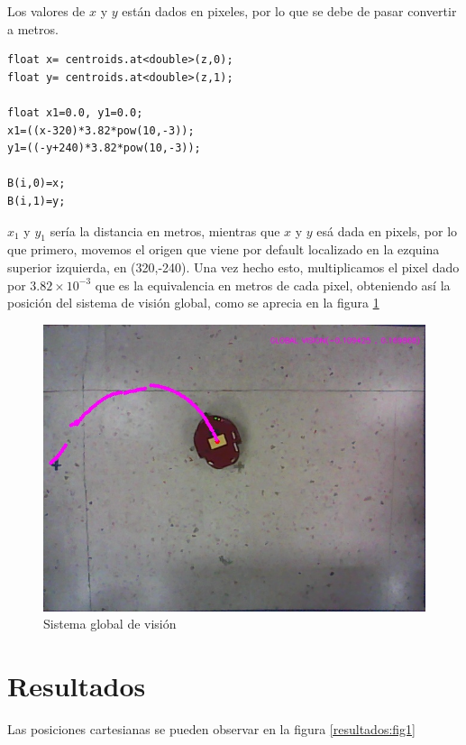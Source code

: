 \documentclass[spanish,10pt,letterpaper, twocolumn]{article}
\begin{document}
Los valores de $x$ y $y$ est\'an dados en pixeles, por lo que se debe de pasar convertir a metros.

\lstset{language=C++}
\begin{lstlisting}[frame=single]
float x= centroids.at<double>(z,0);
float y= centroids.at<double>(z,1);

float x1=0.0, y1=0.0;
x1=((x-320)*3.82*pow(10,-3));
y1=((-y+240)*3.82*pow(10,-3));

B(i,0)=x;
B(i,1)=y;
\end{lstlisting}

$x_1$ y $y_1$ ser\'ia la distancia en metros, mientras que $x$ y $y$ es\'a dada en pixels, por lo que primero, movemos el origen que viene por default localizado en la ezquina superior izquierda, en (320,-240). Una vez hecho esto, multiplicamos el pixel dado por $3.82\times 10^{-3}$ que es la equivalencia en metros de cada pixel, obteniendo as\'i la posici\'on del sistema de visi\'on global, como se aprecia en la figura \ref{vision:fig7}


\begin{figure}[ht]
	\centering
	\includegraphics[scale=0.3]{mejora150.jpg}
	\caption{Sistema global de visi\'on}
	\label{vision:fig7}
\end{figure}

\section{Resultados}

Las posiciones cartesianas se pueden observar en la figura \ref{resultados:fig1}
\end{document}
